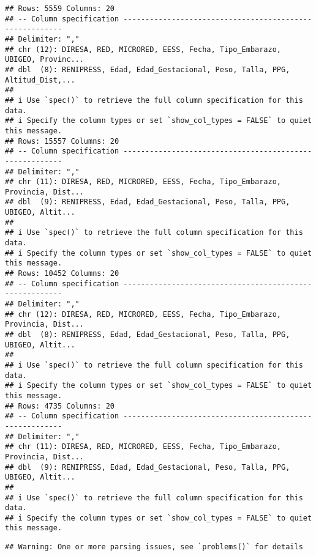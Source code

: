 \documentclass[
]{article}
\begin{document}
\begin{verbatim}
## Rows: 5559 Columns: 20
## -- Column specification --------------------------------------------------------
## Delimiter: ","
## chr (12): DIRESA, RED, MICRORED, EESS, Fecha, Tipo_Embarazo, UBIGEO, Provinc...
## dbl  (8): RENIPRESS, Edad, Edad_Gestacional, Peso, Talla, PPG, Altitud_Dist,...
## 
## i Use `spec()` to retrieve the full column specification for this data.
## i Specify the column types or set `show_col_types = FALSE` to quiet this message.
## Rows: 15557 Columns: 20
## -- Column specification --------------------------------------------------------
## Delimiter: ","
## chr (11): DIRESA, RED, MICRORED, EESS, Fecha, Tipo_Embarazo, Provincia, Dist...
## dbl  (9): RENIPRESS, Edad, Edad_Gestacional, Peso, Talla, PPG, UBIGEO, Altit...
## 
## i Use `spec()` to retrieve the full column specification for this data.
## i Specify the column types or set `show_col_types = FALSE` to quiet this message.
## Rows: 10452 Columns: 20
## -- Column specification --------------------------------------------------------
## Delimiter: ","
## chr (12): DIRESA, RED, MICRORED, EESS, Fecha, Tipo_Embarazo, Provincia, Dist...
## dbl  (8): RENIPRESS, Edad, Edad_Gestacional, Peso, Talla, PPG, UBIGEO, Altit...
## 
## i Use `spec()` to retrieve the full column specification for this data.
## i Specify the column types or set `show_col_types = FALSE` to quiet this message.
## Rows: 4735 Columns: 20
## -- Column specification --------------------------------------------------------
## Delimiter: ","
## chr (11): DIRESA, RED, MICRORED, EESS, Fecha, Tipo_Embarazo, Provincia, Dist...
## dbl  (9): RENIPRESS, Edad, Edad_Gestacional, Peso, Talla, PPG, UBIGEO, Altit...
## 
## i Use `spec()` to retrieve the full column specification for this data.
## i Specify the column types or set `show_col_types = FALSE` to quiet this message.
\end{verbatim}

\begin{verbatim}
## Warning: One or more parsing issues, see `problems()` for details
\end{verbatim}
\end{document}

